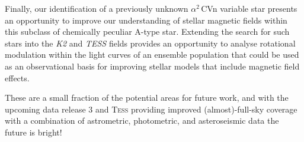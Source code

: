 Finally, our identification of a previously unknown $\alpha^2\,$CVn variable star presents an opportunity to improve our understanding of stellar magnetic fields within this subclass of chemically peculiar A-type star. Extending the search for such stars into the \textit{K2} and \textit{TESS} fields provides an opportunity to analyse rotational modulation within the light curves of an ensemble population that could be used as an observational basis for improving stellar models that include magnetic field effects.

These are a small fraction of the potential areas for future work, and with the upcoming \Gaia{} data release 3 and \textsc{Tess} providing improved (almost)-full-sky coverage with a combination of astrometric, photometric, and asteroseismic data the future is bright! 